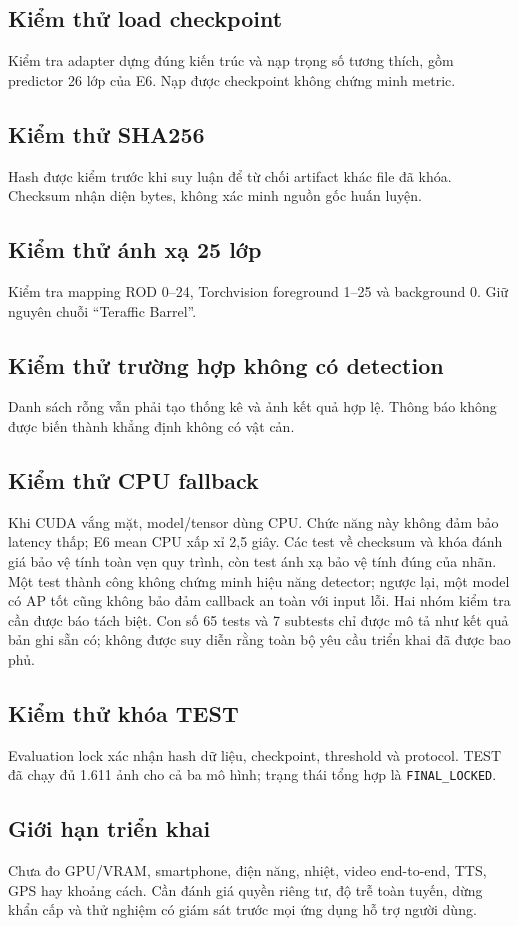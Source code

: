 \documentclass[12pt,a4paper,oneside]{report}
\begin{document}
\subsection{Kiểm thử load checkpoint}
Kiểm tra adapter dựng đúng kiến trúc và nạp trọng số tương thích, gồm predictor 26 lớp của E6. Nạp được checkpoint không chứng minh metric.
\subsection{Kiểm thử SHA256}
Hash được kiểm trước khi suy luận để từ chối artifact khác file đã khóa. Checksum nhận diện bytes, không xác minh nguồn gốc huấn luyện.
\subsection{Kiểm thử ánh xạ 25 lớp}
Kiểm tra mapping ROD 0--24, Torchvision foreground 1--25 và background 0. Giữ nguyên chuỗi “Teraffic Barrel”.
\subsection{Kiểm thử trường hợp không có detection}
Danh sách rỗng vẫn phải tạo thống kê và ảnh kết quả hợp lệ. Thông báo không được biến thành khẳng định không có vật cản.
\subsection{Kiểm thử CPU fallback}
Khi CUDA vắng mặt, model/tensor dùng CPU. Chức năng này không đảm bảo latency thấp; E6 mean CPU xấp xỉ 2,5 giây.
Các test về checksum và khóa đánh giá bảo vệ tính toàn vẹn quy trình, còn test ánh xạ bảo vệ tính đúng của nhãn. Một test thành công không chứng minh hiệu năng detector; ngược lại, một model có AP tốt cũng không bảo đảm callback an toàn với input lỗi. Hai nhóm kiểm tra cần được báo tách biệt. Con số 65 tests và 7 subtests chỉ được mô tả như kết quả bản ghi sẵn có; không được suy diễn rằng toàn bộ yêu cầu triển khai đã được bao phủ.

\subsection{Kiểm thử khóa TEST}
Evaluation lock xác nhận hash dữ liệu, checkpoint, threshold và protocol. TEST đã chạy đủ 1.611 ảnh cho cả ba mô hình; trạng thái tổng hợp là \texttt{FINAL\_LOCKED}.
\subsection{Giới hạn triển khai}
Chưa đo GPU/VRAM, smartphone, điện năng, nhiệt, video end-to-end, TTS, GPS hay khoảng cách. Cần đánh giá quyền riêng tư, độ trễ toàn tuyến, dừng khẩn cấp và thử nghiệm có giám sát trước mọi ứng dụng hỗ trợ người dùng.
\end{document}
